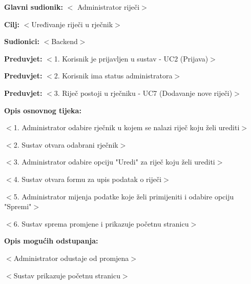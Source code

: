 					\noindent {}
				\begin{packed_item}
					
					\item \textbf{Glavni sudionik: }$<$ Administrator riječi$>$
					\item  \textbf{Cilj:} $<$Uređivanje riječi u rječnik$>$
					\item  \textbf{Sudionici:} $<$Backend$>$
					\item  \textbf{Preduvjet:} $<$1. Korisnik je prijavljen u sustav - UC2 (Prijava)$>$
					\item  \textbf{Preduvjet:} $<$2. Korisnik ima status administratora$>$
					\item  \textbf{Preduvjet:} $<$3. Riječ postoji u rječniku - UC7 (Dodavanje nove riječi)$>$
					\item  \textbf{Opis osnovnog tijeka:}
					
					\item[] \begin{packed_enum}
						
						\item $<$1. Administrator odabire rječnik u kojem se nalazi riječ koju želi urediti$>$
						\item $<$2. Sustav otvara odabrani rječnik$>$
						\item $<$3. Administrator odabire opciju "Uredi" za riječ koju želi urediti$>$
						\item $<$4. Sustav otvara formu za upis podatak o riječi$>$
						\item $<$5. Administrator mijenja podatke koje želi primijeniti i odabire opciju "Spremi"$>$
						\item $<$6. Sustav sprema promjene i prikazuje početnu stranicu$>$
					\end{packed_enum}
					
					\item  \textbf{Opis mogućih odstupanja:}
					
					\item[] \begin{packed_item}
						
						\item[5.a] $<$Administrator odustaje od promjena$>$
						\item[] \begin{packed_enum}
							
							\item $<$Sustav prikazuje početnu stranicu$>$
							
						\end{packed_enum}
						
					\end{packed_item}
				\end{packed_item}
				
